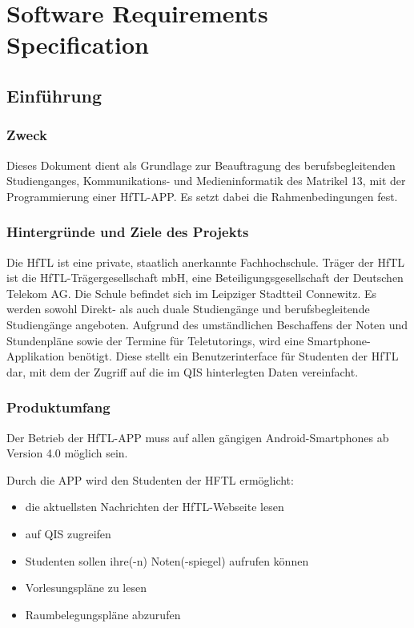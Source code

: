 \section{Software Requirements Specification}

\subsection{Einführung}

\subsubsection{\textbf{Zweck}}
Dieses Dokument dient als Grundlage zur Beauftragung des berufsbegleitenden Studienganges, Kommunikations- und Medieninformatik des Matrikel 13, mit der Programmierung einer \acs{HfTL}-\acs{APP}. Es setzt dabei die Rahmenbedingungen fest.

\subsubsection{\textbf{Hintergründe und Ziele des Projekts}}
Die \acf{HfTL} ist eine private, staatlich anerkannte Fachhochschule. Träger der \ac{HfTL} ist die \ac{HfTL}-Trägergesellschaft \acs{mbH}, eine Beteiligungsgesellschaft der Deutschen Telekom AG. Die Schule befindet sich im Leipziger Stadtteil Connewitz. Es werden sowohl Direkt- als auch duale Studiengänge und berufsbegleitende Studiengänge angeboten.
Aufgrund des umständlichen Beschaffens der Noten und Stundenpläne sowie der Termine für Teletutorings, wird eine Smartphone-Applikation benötigt. Diese stellt ein Benutzerinterface für Studenten der \acs{HfTL} dar, mit dem der Zugriff auf die im \acs{QIS} hinterlegten Daten vereinfacht.

\subsubsection{\textbf{Produktumfang}}

Der Betrieb der \acs{HfTL}-APP muss auf allen gängigen Android-Smartphones ab Version 4.0 möglich sein.

Durch die APP wird den Studenten der HFTL ermöglicht: 

\begin{itemize}
      \item die aktuellsten Nachrichten der \acs{HfTL}-Webseite lesen
      \item auf \acs{QIS} zugreifen
      \item Studenten sollen ihre(-n) Noten(-spiegel) aufrufen können
      \item Vorlesungspläne zu lesen
      \item Raumbelegungspläne abzurufen
\end{itemize}
   

